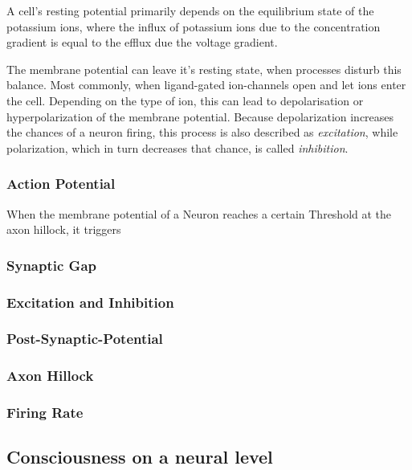 A cell's resting potential primarily depends on the equilibrium state of the potassium ions, where the influx of potassium ions due to the concentration gradient is equal to the efflux due the voltage gradient. 

The membrane potential can leave it's resting state, when processes disturb this balance. Most commonly, when ligand-gated ion-channels open and let ions enter the cell. Depending on the type of ion, this can lead to depolarisation or hyperpolarization of the membrane potential.
Because depolarization increases the chances of a neuron firing, this process is also described as \textit{excitation}, while polarization, which in turn decreases that chance, is called \textit{inhibition}.
\subsubsection{Action Potential}
When the membrane potential of a Neuron reaches a certain Threshold at the axon hillock, it triggers 
\subsubsection{Synaptic Gap}
\subsubsection{Excitation and Inhibition}
\subsubsection{Post-Synaptic-Potential}
\subsubsection{Axon Hillock}
\subsubsection{Firing Rate}
\subsection{Consciousness on a neural level}

